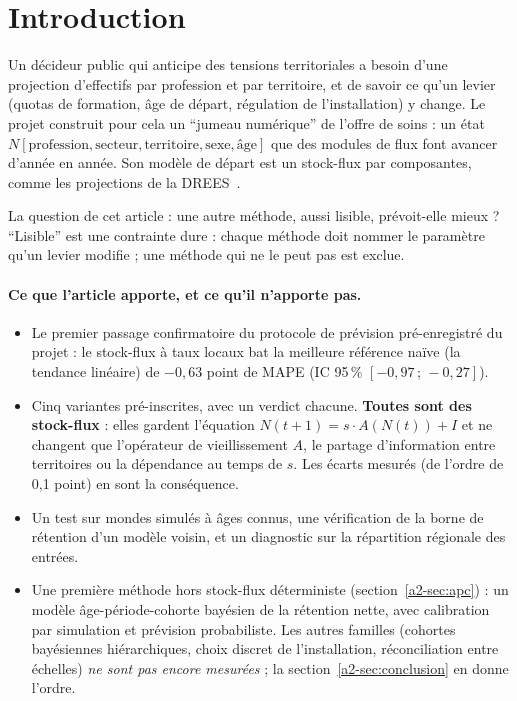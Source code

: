\section{Introduction}
Un décideur public qui anticipe des tensions territoriales a besoin d'une projection d'effectifs par
profession et par territoire, et de savoir ce qu'un levier (quotas de formation, âge de départ,
régulation de l'installation) y change. Le projet construit pour cela un \enquote{jumeau numérique} de
l'offre de soins : un état $N[\text{profession}, \text{secteur}, \text{territoire}, \text{sexe}, \text{âge}]$
que des modules de flux font avancer d'année en année. Son modèle de départ est un stock-flux par
composantes, comme les projections de la DREES~\cite{a2-drees2021dd76}.

La question de cet article : une autre méthode, aussi lisible, prévoit-elle mieux ? \enquote{Lisible}
est une contrainte dure : chaque méthode doit nommer le paramètre qu'un levier modifie ; une méthode qui
ne le peut pas est exclue.

\paragraph{Ce que l'article apporte, et ce qu'il n'apporte pas.}
\begin{itemize}
  \item Le premier passage confirmatoire du protocole de prévision pré-enregistré du projet : le
        stock-flux à taux locaux bat la meilleure référence naïve (la tendance linéaire) de
        $-0{,}63$\mesure{} point de MAPE (IC 95\,\% $[-0{,}97\,;\,-0{,}27]$\mesure).
  \item Cinq variantes pré-inscrites, avec un verdict chacune. \textbf{Toutes sont des stock-flux} :
        elles gardent l'équation $N(t+1) = s \cdot A(N(t)) + I$ et ne changent que l'opérateur de
        vieillissement $A$, le partage d'information entre territoires ou la dépendance au temps de $s$.
        Les écarts mesurés (de l'ordre de 0,1\mesure{} point) en sont la conséquence.
  \item Un test sur mondes simulés à âges connus, une vérification de la borne de rétention d'un modèle
        voisin, et un diagnostic sur la répartition régionale des entrées.
  \item Une première méthode hors stock-flux déterministe (section~\ref{a2-sec:apc}) : un modèle
        âge-période-cohorte bayésien de la rétention nette, avec calibration par simulation et prévision
        probabiliste. Les autres familles (cohortes bayésiennes hiérarchiques, choix discret de
        l'installation, réconciliation entre échelles) \emph{ne sont pas encore mesurées} ; la
        section~\ref{a2-sec:conclusion} en donne l'ordre.
\end{itemize}


